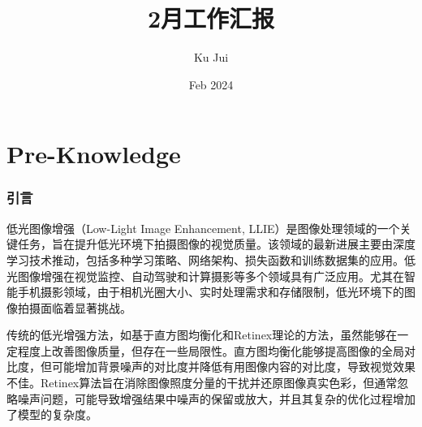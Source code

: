 \documentclass[a4paper, 10pt]{article}
\begin{document}
	
	
	\title{\songti {}2月工作汇报}
	\author{\textrm{Ku Jui}}
	\date{\textrm{Feb 2024}}
	\maketitle
	
	\renewcommand{\figurename}{Figure} %
	
	\renewcommand{\tablename}{Table}
	
	\renewcommand{\cfttoctitlefont}{\hfill\Large\bfseries\songti}
	\renewcommand{\cftaftertoctitle}{\hfill}
	\renewcommand{\contentsname}{Content}
		
	\tableofcontents
	
	\newpage
	
	\part{Pre-Knowledge}	
	
	\section{引言}
		
		低光图像增强（Low-Light Image Enhancement, LLIE）是图像处理领域的一个关键任务，旨在提升低光环境下拍摄图像的视觉质量。该领域的最新进展主要由深度学习技术推动，包括多种学习策略、网络架构、损失函数和训练数据集的应用。低光图像增强在视觉监控、自动驾驶和计算摄影等多个领域具有广泛应用。尤其在智能手机摄影领域，由于相机光圈大小、实时处理需求和存储限制，低光环境下的图像拍摄面临着显著挑战。
		
		传统的低光增强方法，如基于直方图均衡化\cite{ji1994adaptive}和Retinex理论\cite{land1965, land1977retinex, jobson1997properties}的方法，虽然能够在一定程度上改善图像质量，但存在一些局限性。直方图均衡化能够提高图像的全局对比度，但可能增加背景噪声的对比度并降低有用图像内容的对比度，导致视觉效果不佳。Retinex算法旨在消除图像照度分量的干扰并还原图像真实色彩，但通常忽略噪声问题，可能导致增强结果中噪声的保留或放大，并且其复杂的优化过程增加了模型的复杂度。
		
\end{document}
